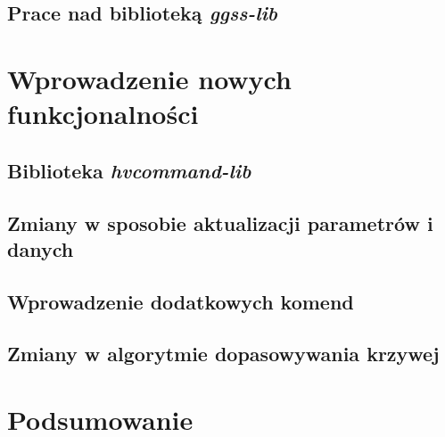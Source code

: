     \subsection{Prace nad biblioteką \emph{ggss-lib}}

\section{Wprowadzenie nowych funkcjonalności}

    \subsection{Biblioteka \emph{hvcommand-lib}}

    \subsection{Zmiany w sposobie aktualizacji parametrów i danych}

    \subsection{Wprowadzenie dodatkowych komend}

    \subsection{Zmiany w algorytmie dopasowywania krzywej}

\section{Podsumowanie}
